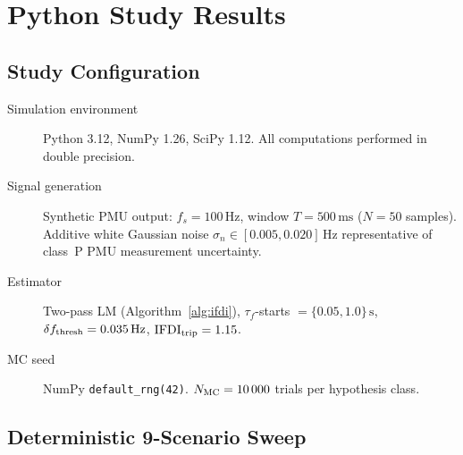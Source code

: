 \documentclass[11pt, a4paper]{article}
\newcommand{\IFDI}{\mathrm{IFDI}}
\begin{document}
\section{Python Study Results}
\label{sec:results}

\subsection{Study Configuration}

\begin{description}
  \item[Simulation environment]
    Python 3.12, NumPy 1.26, SciPy 1.12.  All computations performed in
    double precision.
  \item[Signal generation]
    Synthetic PMU output: $f_s = 100\,\text{Hz}$, window $T = 500\,\text{ms}$
    ($N = 50$ samples).  Additive white Gaussian noise $\sigma_n \in
    [0.005, 0.020]\,\text{Hz}$ representative of class~P PMU measurement
    uncertainty.
  \item[Estimator]
    Two-pass LM (Algorithm~\ref{alg:ifdi}), $\tau_f$-starts $= \{0.05, 1.0\}\,\text{s}$,
    $\delta f_{\rm thresh} = 0.035\,\text{Hz}$, $\IFDI_{\rm trip} = 1.15$.
  \item[MC seed]
    NumPy \texttt{default\_rng(42)}.  $N_{\rm MC} = 10\,000$ trials per
    hypothesis class.
\end{description}

\subsection{Deterministic 9-Scenario Sweep}
\end{document}
